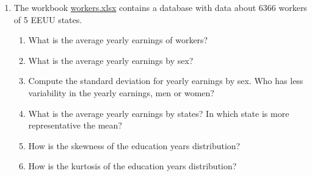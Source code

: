 \begin{enumerate}[leftmargin=*,resume]
\item The workbook
\href{http://aprendeconalf.es/office/excel/exercises/databases/workers.xlsx}{\textsf{workers.xlsx}}
contains a database with data about 6366 workers of 5 EEUU states.
\begin{enumerate}
\item What is the average yearly earnings of workers?
\item What is the average yearly earnings by sex?
\item Compute the standard deviation for yearly earnings by sex.
Who has less variability in the yearly earnings, men or women?
\item What is the average yearly earnings by states?
In which state is more representative the mean?
\item How is the skewness of the education years distribution?
\item How is the kurtosis of the education years distribution?
\end{enumerate}


\end{enumerate}